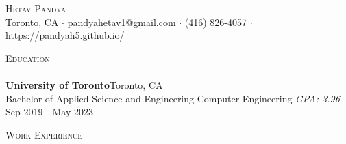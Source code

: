 \documentclass[a4paper]{article}
\newcommand{\lineunder} {
    \vspace*{-8pt} \\
    \hspace*{-18pt} \hrulefill \\
}
\newcommand{\header} [1] {
    {\hspace*{-18pt}\vspace*{6pt} \textsc{#1}}
    \vspace*{-6pt} \lineunder
}
\begin{document}
\vspace*{-40pt}

    

\vspace*{-10pt}
\begin{center}
	{\Huge \scshape {Hetav Pandya}}\\
	Toronto, CA $\cdot$ pandyahetav1@gmail.com $\cdot$ (416) 826-4057 $\cdot$ https://pandyah5.github.io/\\
\end{center}

\header{Education}
\textbf{University of Toronto}\hfill Toronto, CA\\
Bachelor of Applied Science and Engineering Computer Engineering \textit{GPA: 3.96} \hfill Sep 2019 - May 2023\\
\vspace{2mm}

\header{Work Experience}
\vspace{1mm}
\end{document}
